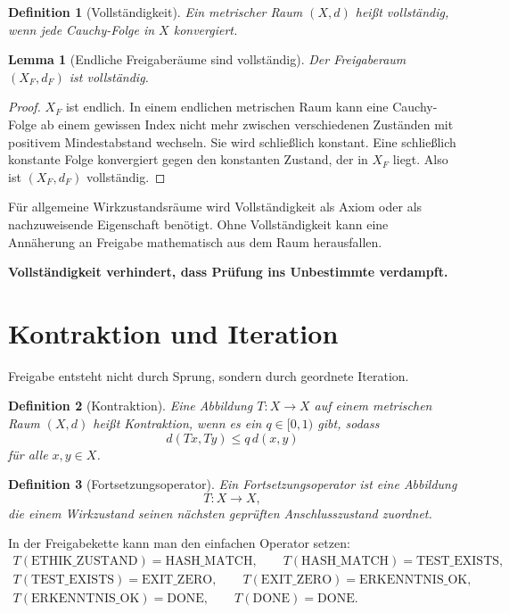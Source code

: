 \documentclass[11pt,a4paper,oneside]{scrartcl}
\theoremstyle{qikstyle}
\newtheorem{definition}{Definition}[section]
\newtheorem{lemma}[satz]{Lemma}
\newcommand{\DONE}{\mathrm{DONE}}
\newcommand{\HASH}{\mathrm{HASH\_MATCH}}
\newcommand{\TEST}{\mathrm{TEST\_EXISTS}}
\newcommand{\EXIT}{\mathrm{EXIT\_ZERO}}
\newcommand{\ERK}{\mathrm{ERKENNTNIS\_OK}}
\newcommand{\ETH}{\mathrm{ETHIK\_ZUSTAND}}
\newenvironment{merksatz}{\begin{center}\begin{minipage}{0.92\linewidth}\sffamily\bfseries}{\end{minipage}\end{center}}
\begin{document}
\begin{definition}[Vollständigkeit]
Ein metrischer Raum \((X,d)\) heißt vollständig, wenn jede Cauchy-Folge in \(X\) konvergiert.
\end{definition}

\begin{lemma}[Endliche Freigaberäume sind vollständig]
Der Freigaberaum \((X_F,d_F)\) ist vollständig.
\end{lemma}

\begin{proof}
\(X_F\) ist endlich. In einem endlichen metrischen Raum kann eine Cauchy-Folge ab einem gewissen Index nicht mehr zwischen verschiedenen Zuständen mit positivem Mindestabstand wechseln. Sie wird schließlich konstant. Eine schließlich konstante Folge konvergiert gegen den konstanten Zustand, der in \(X_F\) liegt. Also ist \((X_F,d_F)\) vollständig.
\end{proof}

Für allgemeine Wirkzustandsräume wird Vollständigkeit als Axiom oder als nachzuweisende Eigenschaft benötigt. Ohne Vollständigkeit kann eine Annäherung an Freigabe mathematisch aus dem Raum herausfallen.

\begin{merksatz}
Vollständigkeit verhindert, dass Prüfung ins Unbestimmte verdampft.
\end{merksatz}
\newpage

\section{Kontraktion und Iteration}

Freigabe entsteht nicht durch Sprung, sondern durch geordnete Iteration.

\begin{definition}[Kontraktion]
Eine Abbildung \(T:X\to X\) auf einem metrischen Raum \((X,d)\) heißt Kontraktion, wenn es ein \(q\in[0,1)\) gibt, sodass
\[
d(Tx,Ty)\leq q\,d(x,y)
\]
für alle \(x,y\in X\).
\end{definition}

\begin{definition}[Fortsetzungsoperator]
Ein Fortsetzungsoperator ist eine Abbildung
\[
T:X\to X,
\]
die einem Wirkzustand seinen nächsten geprüften Anschlusszustand zuordnet.
\end{definition}

In der Freigabekette kann man den einfachen Operator setzen:
\[
\begin{gathered}
T(\ETH)=\HASH,\qquad T(\HASH)=\TEST,\\
T(\TEST)=\EXIT,\qquad T(\EXIT)=\ERK,\\
T(\ERK)=\DONE,\qquad T(\DONE)=\DONE.
\end{gathered}
\]
\end{document}
